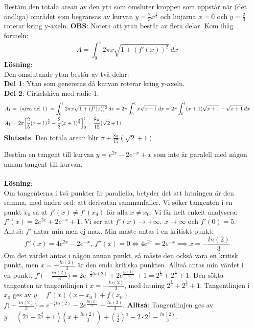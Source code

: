 \documentclass{report}
\begin{document}
{
	Bestäm den totala arean av den yta som omsluter kroppen som uppstår när (det ändliga) området som begränsas av kurvan $ y = \frac{2}{3} x ^{ \frac{3}{2}  } $ och linjärna $ x = 0 $ och $ y = \frac{2}{3}  $ roterar kring y-axeln. \textbf{OBS}: Notera att ytan består av flera delar. Kom ihåg formeln:
	\begin{equation*}
	A = \int_{0}^{1} 2\pi x \sqrt{1 + (f'(x))^2}  \: dx 
	\end{equation*}
\textbf{Lösning}:\\
Den omslutande ytan består av två delar:\\
\textbf{Del 1}: Ytan som genereras då kurvan roterar kring y-axeln.\\
\textbf{Del 2}: Cirkelskiva med radie 1.
\begin{align*}
	&A_1 = \text{ (area del 1) } = \int_{0}^{1} 2 \pi x \sqrt{1 + (f'(x))^2}  \: dx = 2\pi \int_{0}^{1} x\sqrt{x+1}  \: dx = 2\pi \int_{0}^{1} (x+1) \sqrt{x+1} - \sqrt{x+1}  \: dx \\
	&A_1 = 2\pi \Bigl[ \frac{2}{5} (x+1)^{ \frac{5}{2}  } - \frac{2}{3} (x+1)^{ \frac{3}{2}  }  \Bigr]_{0}^{1} = \frac{8\pi}{15} ( \sqrt{2} + 1)    
\end{align*}
\textbf{Slutsats}: Den totala arean blir $ \pi + \frac{8\pi}{15} ( \sqrt{2} +1) $ 
}

{
	Bestäm en tangent till kurvan $ y = e^{2x} - 2e^{-x} + x $ som inte är paralell med någon annan tangent till kurvan.\\\\

	\textbf{Lösning}:\\
	Om tangenterna i två punkter är parallella, betyder det att lutningen är den samma, med andra ord: att derivatan sammanfaller. Vi söker tangenten i en punkt $ x_0 $ så at $ f'(x) \ne f'(x_0) $ för alla $ x \ne x_0 $. Vi får helt enkelt analysera: $ f'(x) = 2e^{2x} + 2e^{-x} + 1 $. Vi ser att $ f'(x) \to + \infty,\:x \to \infty $ och $ f'(0) = 5 $. Alltså: $ f' $ antar min men ej max. Min måste antas i en kritiskt punkt:
\begin{equation*}
	f''(x) = 4e^{2x} - 2e^{-x},\: f''(x) = 0 \iff 4e^{2x} = 2e^{-x} \implies x = - \frac{ln(2)}{3}  
\end{equation*}
Om det värdet antas i någon annan punkt, så måste den också vara en kritisk punkt, men $ x = - \frac{ln(2)}{3}  $ är den enda kritiska punkten. Alltså antas min värdet i en punkt. $ f'\bigl( - \frac{ln(2)}{3}  \bigr) = 2e^{ - \frac{2}{3} ln(2) } + 2 e^{ \frac{ln(2)}{3}  } + 1 = 2^{ \frac{1}{3}  } + 2^{ \frac{4}{3}  } + 1 $. Den sökta tangenten är tangentlinjen i $ x = - \frac{ln(2)}{3}  $, med lutning $ 2^{ \frac{1}{3} } + 2^{ \frac{4}{3}  } + 1$. Tangentlinjen i $ x_0 $ ges av $ y = f'(x)(x-x_0)+f(x_0) $. $ f\bigl( - \frac{ln(2)}{3}  \bigr) = e^{- \frac{2}{3} ln(2) } - 2e^{ \frac{ln(2)}{3}  } - \frac{ln(2)}{3} $. \textbf{Alltså}: Tangentlinjen ges av $ y = (2^{ \frac{1}{3}  }  + 2^{ \frac{4}{3}  } + 1)(x + \frac{ln(2)}{3} ) + ( \frac{1}{2}  )^{ \frac{1}{3}  }- 2 \cdot 2^{ \frac{1}{3}  } - \frac{ln(2)}{3}  $.     
}
\end{document}
